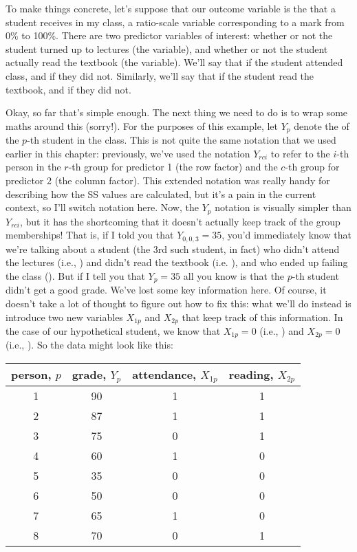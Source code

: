 
To make things concrete, let's suppose that our outcome variable is the  that a student receives in my class, a ratio-scale variable corresponding to a mark from 0\% to 100\%. There are two predictor variables of interest: whether or not the student turned up to lectures (the  variable), and whether or not the student actually read the textbook (the  variable). We'll say that  if the student attended class, and  if they did not. Similarly, we'll say that  if the student read the textbook, and  if they did not. 

Okay, so far that's simple enough. The next thing we need to do is to wrap some maths around this (sorry!). For the purposes of this example, let $Y_p$ denote the  of the $p$-th student in the class. This is not quite the same notation that we used earlier in this chapter: previously, we've used the notation $Y_{rci}$ to refer to the $i$-th person in the $r$-th group for predictor 1 (the row factor) and the $c$-th group for predictor 2 (the column factor). This extended notation was really handy for describing how the SS values are calculated, but it's a pain in the current context, so I'll switch notation here. Now, the $Y_p$ notation is visually simpler than $Y_{rci}$, but it has the shortcoming that it doesn't actually keep track of the group memberships! That is, if I told you that $Y_{0,0,3} = 35$, you'd immediately know that we're talking about a student (the 3rd such student, in fact) who didn't attend the lectures (i.e., ) and didn't read the textbook (i.e. ), and who ended up failing the class (). But if I tell you that $Y_p = 35$ all you know is that the $p$-th student didn't get a good grade. We've lost some key information here. Of course, it doesn't take a lot of thought to figure out how to fix this: what we'll do instead is introduce two new variables $X_{1p}$ and $X_{2p}$ that keep track of this information. In the case of our hypothetical student, we know that $X_{1p} = 0$ (i.e., ) and $X_{2p} = 0$ (i.e., ). So the data might look like this:

\begin{center}
\begin{tabular}{c|c|c|c}
person, $p$ & grade, $Y_p$ & attendance, $X_{1p}$ & reading, $X_{2p}$ \\ \hline
1 &  90  &  1  & 1 \\  
2 &	 87  &  1  & 1 \\ 
3 &  75  &  0  & 1 \\ 
4 &	 60  &  1  & 0 \\
5 &  35  &  0  & 0 \\
6 &  50  &  0  & 0 \\
7 &  65  &  1  & 0 \\
8 &  70  &  0  & 1 
\end{tabular}
\end{center}

